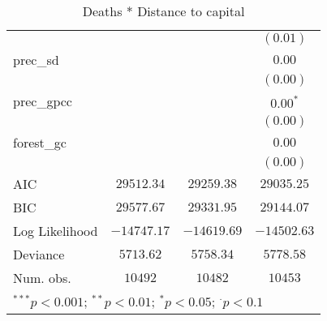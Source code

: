\begin{sidewaystable}
\begin{center}
{\begin{tabular}{l c c c}
                     &                &               & $(0.01)$      \\
prec\_sd             &                &               & $0.00$        \\
                     &                &               & $(0.00)$      \\
prec\_gpcc           &                &               & $0.00^{*}$    \\
                     &                &               & $(0.00)$      \\
forest\_gc           &                &               & $0.00$        \\
                     &                &               & $(0.00)$      \\
\hline
AIC                  & $29512.34$     & $29259.38$    & $29035.25$    \\
BIC                  & $29577.67$     & $29331.95$    & $29144.07$    \\
Log Likelihood       & $-14747.17$    & $-14619.69$   & $-14502.63$   \\
Deviance             & $5713.62$      & $5758.34$     & $5778.58$     \\
Num. obs.            & $10492$        & $10482$       & $10453$       \\
\hline
\multicolumn{4}{l}{\scriptsize{$^{***}p<0.001$; $^{**}p<0.01$; $^{*}p<0.05$; $^{\cdot}p<0.1$}}
\end{tabular}
}
\caption{Deaths * Distance to capital}
\label{interaction_sqrtDeaths}
\end{center}
\end{sidewaystable}
